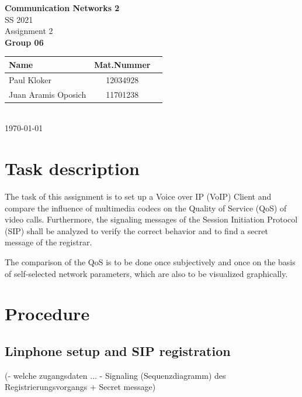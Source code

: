 \documentclass[parskip=full]{scrartcl}
\begin{document}
\begin{titlepage}
    \centering
    \vspace*{2cm}
    {\Huge \textbf{Communication Networks 2}}\\
    SS 2021\\
    \vspace*{1cm}
    {\Large Assignment 2}
    \\\vspace*{3cm}
    {\Large \textbf{Group 06}}\\
    \vspace*{1cm}
    {\large 
        \begin{tabular}{l c c}
            Name & Mat.Nummer \\ \hline
            Paul Kloker & 12034928 \\
            Juan Aramis Oposich & 11701238
        \end{tabular}
    }
    \\\vspace*{7cm}
    \today
\end{titlepage}

\section{Task description} \label{sec:task}
The task of this assignment is to set up a Voice over IP (VoIP) Client and compare the influence of multimedia codecs on the Quality of Service (QoS) of video calls.
Furthermore, the signaling messages of the Session Initiation Protocol (SIP) shall be analyzed to verify the correct behavior and to find a secret message of the registrar.

The comparison of the QoS is to be done once subjectively and once on the basis of self-selected network parameters, which are also to be visualized graphically. 


\section{Procedure} \label{sec:procedure}

\subsection{Linphone setup and SIP registration} \label{subsec:setup}
(- welche zugangsdaten ... 
- Signaling (Sequenzdiagramm) des Registrierungsvorgangs + Secret message)
\end{document}
